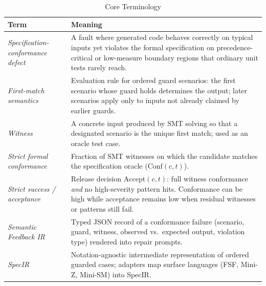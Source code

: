 \begin{table}[t]
\caption{Core Terminology}
\label{tab:glossary}
\centering
\begin{tabular}{p{} p{}}
\toprule
Term & Meaning \\
\midrule
\emph{Specification-conformance defect}
  & A fault where generated code behaves correctly on typical inputs yet
    violates the formal specification on precedence-critical or
    low-measure boundary regions that ordinary unit tests rarely reach. \\
\emph{First-match semantics}
  & Evaluation rule for ordered guard scenarios: the first scenario whose
    guard holds determines the output; later scenarios apply only to inputs
    not already claimed by earlier guards. \\
\emph{Witness}
  & A concrete input produced by SMT solving so that a designated scenario
    is the unique first match; used as an oracle test case. \\
\emph{Strict formal conformance}
  & Fraction of SMT witnesses on which the candidate matches the
    specification oracle ($\mathrm{Conf}(c,t)$). \\
\emph{Strict success / acceptance}
  & Release decision $\mathrm{Accept}(c,t)$: full witness conformance
    \emph{and} no high-severity pattern hits. Conformance can be high while
    acceptance remains low when residual witnesses or patterns still fail. \\
\emph{Semantic Feedback IR}
  & Typed JSON record of a conformance failure (scenario, guard, witness,
    observed vs.\ expected output, violation type) rendered into repair
    prompts. \\
\emph{SpecIR}
  & Notation-agnostic intermediate representation of ordered guarded cases;
    adapters map surface languages (FSF, Mini-Z, Mini-SM) into SpecIR. \\
\bottomrule
\end{tabular}
\end{table}
